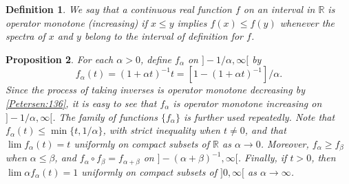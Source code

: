 \documentclass{book}
\newtheorem{definition}{Definition}[section]
\newtheorem{proposition}[definition]{Proposition}
\begin{document}
\begin{definition}
  We say that a continuous real function \(f\) on an interval in \(\mathbb{R}\) is
  \textnormal{operator monotone (increasing)} if \(x\leq y\) implies \(f(x)\leq f(y)\)
  whenever the spectra of \(x\) and \(y\) belong to the interval of definition for \(f\).
\end{definition}
 
\begin{proposition}\label{Petersen:137}
  For each \(\alpha>0\), define \(f_\alpha\) on \(]-1/\alpha,\infty[\) by
  \[
    f_\alpha(t)={(1+\alpha t)}^{-1}t={[1-{(1+\alpha t)}^{-1}]}/\alpha.
  \]
  Since the process of taking inverses is operator monotone decreasing by \ref{Petersen:136},
  it is easy to see that \(f_\alpha\) is operator monotone increasing on \(]-1/\alpha,\infty[\).
  The family of functions \(\{f_\alpha\}\) is further used repeatedly. Note that \(f_\alpha(t)\leq\min\{t,1/\alpha\}\),
  with strict inequality when \(t\neq0\),
  and that \(\lim f_\alpha(t)=t\) uniformly on compact subsets of \(\mathbb{R}\) as \(\alpha\rightarrow 0\).
  Moreover, \(f_\alpha\geq f_\beta\) when \(\alpha\leq\beta\), and \(f_\alpha\circ f_\beta=f_{\alpha+\beta}\) on \(]-{(\alpha+\beta)}^{-1},\infty[\).
  Finally, if \(t>0\), then \(\lim\alpha f_\alpha(t)=1\) uniformly on compact subsets of \(]0,\infty[\) as \(\alpha\rightarrow \infty\).
\end{proposition}
\end{document}
